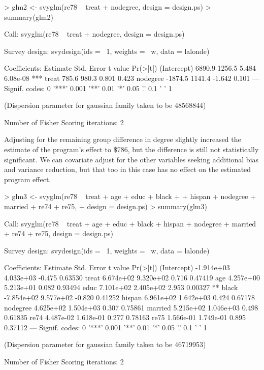 \documentclass{article}
\begin{document}
\begin{Schunk}
\begin{Sinput}
> glm2 <- svyglm(re78 ~ treat + nodegree, design = design.ps)
> summary(glm2)
\end{Sinput}
\begin{Soutput}
Call:
svyglm(re78 ~ treat + nodegree, design = design.ps)

Survey design:
svydesign(ids = ~1, weights = ~w, data = lalonde)

Coefficients:
            Estimate Std. Error t value Pr(>|t|)    
(Intercept)   6890.9     1256.5   5.484 6.08e-08 ***
treat          785.6      980.3   0.801    0.423    
nodegree     -1874.5     1141.4  -1.642    0.101    
---
Signif. codes:  0 '***' 0.001 '**' 0.01 '*' 0.05 '.' 0.1 ' ' 1 

(Dispersion parameter for gaussian family taken to be 48568844)

Number of Fisher Scoring iterations: 2
\end{Soutput}
\end{Schunk}

Adjusting for the remaining group difference in degree slightly increased the
estimate of the program's effect to \$786, but the
difference is still not statistically significant. We can covariate adjust for
the other variables seeking additional bias and variance reduction, but that
too in this case has no effect on the estimated program effect.

\begin{Schunk}
\begin{Sinput}
> glm3 <- svyglm(re78 ~ treat + age + educ + black + 
+     hispan + nodegree + married + re74 + re75, 
+     design = design.ps)
> summary(glm3)
\end{Sinput}
\begin{Soutput}
Call:
svyglm(re78 ~ treat + age + educ + black + hispan + nodegree + 
    married + re74 + re75, design = design.ps)

Survey design:
svydesign(ids = ~1, weights = ~w, data = lalonde)

Coefficients:
              Estimate Std. Error t value Pr(>|t|)   
(Intercept) -1.914e+03  4.033e+03  -0.475  0.63530   
treat        6.674e+02  9.320e+02   0.716  0.47419   
age          4.257e+00  5.213e+01   0.082  0.93494   
educ         7.101e+02  2.405e+02   2.953  0.00327 **
black       -7.854e+02  9.577e+02  -0.820  0.41252   
hispan       6.961e+02  1.642e+03   0.424  0.67178   
nodegree     4.625e+02  1.504e+03   0.307  0.75861   
married      5.215e+02  1.046e+03   0.498  0.61835   
re74         4.487e-02  1.618e-01   0.277  0.78163   
re75         1.566e-01  1.749e-01   0.895  0.37112   
---
Signif. codes:  0 '***' 0.001 '**' 0.01 '*' 0.05 '.' 0.1 ' ' 1 

(Dispersion parameter for gaussian family taken to be 46719953)

Number of Fisher Scoring iterations: 2
\end{Soutput}
\end{Schunk}
\end{document}
